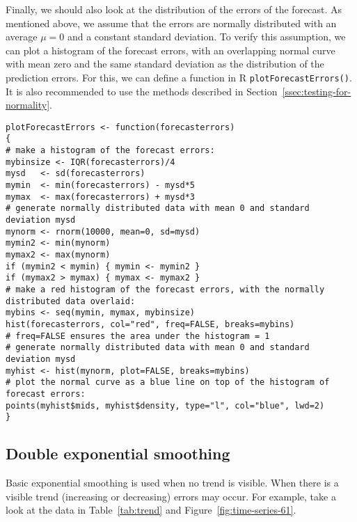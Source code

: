 Finally, we should also look at the distribution of the errors of the forecast. As mentioned above, we assume that the errors are normally distributed with an average $\mu = 0$ and a constant standard deviation. To verify this assumption, we can plot a histogram of the forecast errors, with an overlapping normal curve with mean zero and the same standard deviation as the distribution of the prediction errors. For this, we can define a function in R \texttt{plotForecastErrors()}. It is also recommended to use the methods described in Section~\ref{ssec:testing-for-normality}.


\begin{lstlisting}
plotForecastErrors <- function(forecasterrors)
{
# make a histogram of the forecast errors:
mybinsize <- IQR(forecasterrors)/4
mysd   <- sd(forecasterrors)
mymin  <- min(forecasterrors) - mysd*5
mymax  <- max(forecasterrors) + mysd*3
# generate normally distributed data with mean 0 and standard deviation mysd
mynorm <- rnorm(10000, mean=0, sd=mysd)
mymin2 <- min(mynorm)
mymax2 <- max(mynorm)
if (mymin2 < mymin) { mymin <- mymin2 }
if (mymax2 > mymax) { mymax <- mymax2 }
# make a red histogram of the forecast errors, with the normally distributed data overlaid:
mybins <- seq(mymin, mymax, mybinsize)
hist(forecasterrors, col="red", freq=FALSE, breaks=mybins)
# freq=FALSE ensures the area under the histogram = 1
# generate normally distributed data with mean 0 and standard deviation mysd
myhist <- hist(mynorm, plot=FALSE, breaks=mybins)
# plot the normal curve as a blue line on top of the histogram of forecast errors:
points(myhist$mids, myhist$density, type="l", col="blue", lwd=2)
}
\end{lstlisting}

\subsection{Double exponential smoothing}

Basic exponential smoothing is used when no trend is visible. When there is a visible trend (increasing or decreasing) errors may occur. For example, take a look at the data in Table~\ref{tab:trend} and Figure~\ref{fig:time-series-61}.

